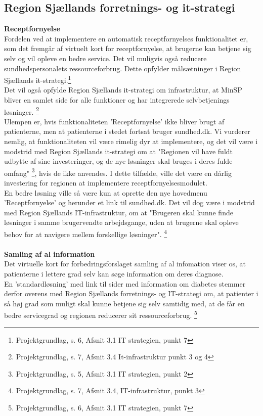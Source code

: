 \subsection{Region Sjællands forretnings- og it-strategi}
\textbf{Receptfornyelse}\\
Fordelen ved at implementere en automatisk receptfornyelses funktionalitet er, som det fremgår af virtuelt kort for receptfornyelse, at brugerne kan betjene sig selv og vil opleve en bedre service. Det vil muligvis også reducere sundhedspersonalets ressourceforbrug. Dette opfylder målsætninger i Region Sjællands it-strategi.\footnote{Projektgrundlag, s. 6, Afsnit 3.1 IT strategien, punkt 7 }\\
Det vil også opfylde Region Sjællands it-strategi om infrastruktur, at MinSP bliver en samlet side for alle funktioner og har integrerede selvbetjenings løsninger. \footnote{Projektgrundlag, s. 7, Afsnit 3.4 It-infrastruktur punkt 3 og 4}\\
Ulempen er, hvis funktionaliteten 'Receptfornyelse' ikke bliver brugt af patienterne, men at patienterne i stedet fortsat bruger sundhed.dk. Vi vurderer nemlig, at funktionaliteten vil være rimelig dyr at implementere, og det vil være i modstrid med Region Sjællands it-strategi om at "Regionen vil have fuldt udbytte af sine investeringer, og de nye løsninger skal bruges i deres fulde omfang" \footnote{Projektgrundlag, s. 5, Afsnit 3.1 IT strategien, punkt 2}, hvis de ikke anvendes. I dette tilfælde, ville det være en dårlig investering for regionen at implementere receptfornyelsesmodulet.\\ 
En bedre løsning ville så være kun at oprette den nye hovedmenu 'Receptfornyelse' og herunder et link til sundhed.dk. Det vil dog være i modstrid med Region Sjællands IT-infrastruktur, om at "Brugeren skal kunne finde løsninger i samme brugervendte arbejdsgange, uden at brugerne skal opleve behov for at navigere mellem forskellige løsninger". \footnote{Projektgrundlag, s. 7, Afsnit 3.4, IT-infrastruktur, punkt 3} 
\\\\
\textbf{Samling af al information}\\
Det virtuelle kort for forbedringsforslaget samling af al infomation viser os, at patienterne i lettere grad selv kan søge information om deres diagnose.\\
En 'standardløsning' med link til sider med information om diabetes stemmer derfor overens med Region Sjællands forretnings- og IT-strategi om, at patienter i så høj grad som muligt skal kunne betjene sig selv samtidig med, at de får en bedre servicegrad og regionen reducerer sit ressourceforbrug. \footnote{Projektgrundlag, s. 6, Afsnit 3.1 IT strategien, punkt 7} \\
